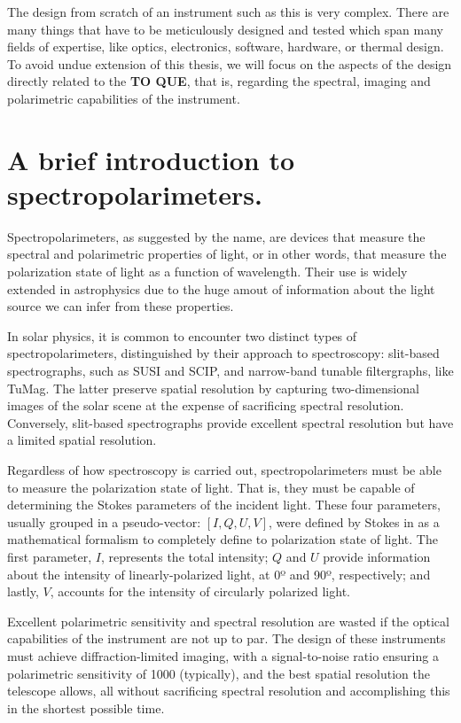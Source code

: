 \documentclass[12pt]{mythesis}
\begin{document}
The design from scratch of an instrument such as this is very complex. There are many things that have to be meticulously designed and tested which span many fields of expertise, like optics, electronics, software, hardware, or thermal design. To avoid undue extension of this thesis, we will focus on the aspects of the design directly related to the \textbf{TO QUE}, that is, regarding the spectral, imaging and polarimetric capabilities of the instrument. 

\section{A brief introduction to spectropolarimeters.}

Spectropolarimeters, as suggested by the name, are devices that measure the spectral and polarimetric properties of light, or in other words, that measure the polarization state of light as a function of wavelength. Their use is widely extended in astrophysics due to the huge amout of information about the light source we can infer from these properties.

In solar physics, it is common to encounter two distinct types of spectropolarimeters, distinguished by their approach to spectroscopy: slit-based spectrographs, such as SUSI and SCIP, and narrow-band tunable filtergraphs, like TuMag. The latter preserve spatial resolution by capturing two-dimensional images of the solar scene at the expense of sacrificing spectral resolution. Conversely, slit-based spectrographs provide excellent spectral resolution but have a limited spatial resolution. 

Regardless of how spectroscopy is carried out, spectropolarimeters must be able to measure the polarization state of light. That is, they must be capable of determining the Stokes parameters  of the incident light. These four parameters, usually grouped in a pseudo-vector: $[I, Q, U, V]$, were defined by Stokes in \cite{Stokes_vector} as a mathematical formalism to completely define to polarization state of light. The first parameter, $I$, represents the total intensity; $Q$ and $U$ provide information about the intensity of linearly-polarized light, at 0º and 90º, respectively; and lastly, $V$, accounts for the intensity of circularly polarized light. 

Excellent polarimetric sensitivity and spectral resolution are wasted if the optical capabilities of the instrument are not up to par. The design of these instruments must achieve diffraction-limited imaging, with a signal-to-noise ratio ensuring a polarimetric sensitivity of 1000 (typically), and the best spatial resolution the telescope allows, all without sacrificing spectral resolution and accomplishing this in the shortest possible time.
\end{document}
